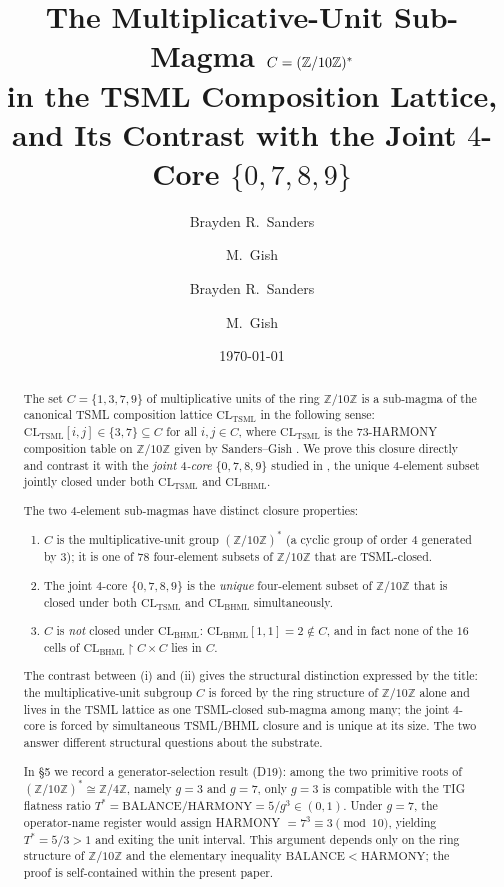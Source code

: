 \documentclass[11pt,reqno]{amsart}
\title[Multiplicative units of $\Z/10\Z$ and the joint 4-core]
{The Multiplicative-Unit Sub-Magma $C = (\Z/10\Z)^*$ \\
 in the TSML Composition Lattice, \\
 and Its Contrast with the Joint $4$-Core $\{0, 7, 8, 9\}$}
\author{Brayden R.\ Sanders \and M.\ Gish}
\author{Brayden R.\ Sanders \and M.\ Gish}
\date{\today}
\theoremstyle{plain}
\theoremstyle{definition}
\theoremstyle{remark}
\newcommand{\Z}{\mathbb{Z}}
\newcommand{\TSML}{\mathrm{TSML}}
\newcommand{\BHML}{\mathrm{BHML}}
\begin{document}
\begin{abstract}
The set $C = \{1, 3, 7, 9\}$ of multiplicative units of the ring
$\Z/10\Z$ is a sub-magma of the canonical TSML composition lattice
$\mathrm{CL}_\TSML$ in the following sense: $\mathrm{CL}_\TSML[i, j] \in
\{3, 7\} \subseteq C$ for all $i, j \in C$, where $\mathrm{CL}_\TSML$ is
the $73$-HARMONY composition table on $\Z/10\Z$ given by Sanders--Gish
\cite{SandersForcing}.  We prove this closure directly and contrast it
with the \emph{joint $4$-core} $\{0, 7, 8, 9\}$ studied in
\cite{SandersGishFourCore}, the unique $4$-element subset jointly closed
under both $\mathrm{CL}_\TSML$ and $\mathrm{CL}_\BHML$.

The two $4$-element sub-magmas have distinct closure properties:
\begin{enumerate}[label={\emph{(\arabic*)}}]
\item $C$ is the multiplicative-unit group $(\Z/10\Z)^*$ (a cyclic group
of order $4$ generated by $3$); it is one of $78$ four-element subsets
of $\Z/10\Z$ that are TSML-closed.
\item The joint $4$-core $\{0, 7, 8, 9\}$ is the \emph{unique}
four-element subset of $\Z/10\Z$ that is closed under both
$\mathrm{CL}_\TSML$ and $\mathrm{CL}_\BHML$ simultaneously.
\item $C$ is \emph{not} closed under $\mathrm{CL}_\BHML$:
$\mathrm{CL}_\BHML[1, 1] = 2 \notin C$, and in fact none of the $16$
cells of $\mathrm{CL}_\BHML \restriction C \times C$ lies in $C$.
\end{enumerate}
The contrast between (i) and (ii) gives the structural distinction
expressed by the title: the multiplicative-unit subgroup $C$ is forced
by the ring structure of $\Z/10\Z$ alone and lives in the TSML lattice
as one TSML-closed sub-magma among many; the joint $4$-core is forced
by simultaneous TSML/BHML closure and is unique at its size.
The two answer different structural questions about the substrate.

In §5 we record a generator-selection result (D19): among the two
primitive roots of $(\Z/10\Z)^* \cong \Z/4\Z$, namely $g = 3$ and
$g = 7$, only $g = 3$ is compatible with the TIG flatness ratio
$T^* = \mathrm{BALANCE}/\mathrm{HARMONY} = 5/g^3 \in (0, 1)$.  Under
$g = 7$, the operator-name register would assign HARMONY $= 7^3
\equiv 3 \pmod{10}$, yielding $T^* = 5/3 > 1$ and exiting the unit
interval.  This argument depends only on the ring structure of
$\Z/10\Z$ and the elementary inequality
$\mathrm{BALANCE} < \mathrm{HARMONY}$; the proof is self-contained
within the present paper.
\end{abstract}
\end{document}
